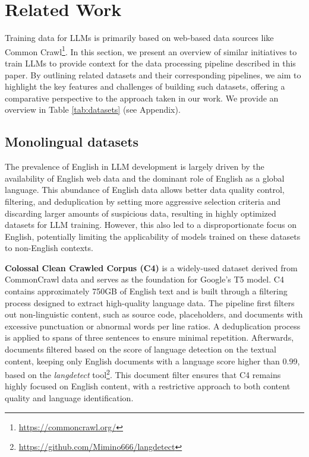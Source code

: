 \section{Related Work}
\label{sec:rel_work}
Training data for LLMs is primarily based on 
web-based data sources like Common Crawl\footnote{\url{https://commoncrawl.org/}}.  
In this section, we present an overview of similar initiatives 
to train LLMs to provide context for the data processing pipeline 
described in this paper. By outlining related datasets and their 
corresponding pipelines, we aim to highlight the key features 
and challenges of building such datasets, offering a comparative 
perspective to the approach taken in our 
work. We provide an overview in Table \ref{tab:datasets} (see Appendix).


\subsection{Monolingual datasets}
\label{sec:rel_work.mono}
The prevalence of English in LLM development is largely driven 
by the availability of English web data and the dominant role 
of English as a global language.
This abundance of English data allows better data quality control,
filtering, and deduplication by setting more aggressive selection criteria
and discarding larger amounts of suspicious data,
resulting in highly optimized datasets for LLM training.
However, this also led to a disproportionate focus on English, potentially limiting the applicability of models trained on these datasets to non-English contexts.

\textbf{Colossal Clean Crawled Corpus (C4)} \cite{raffel_shazeer_etal2020} 
is a widely-used dataset derived from CommonCrawl data and serves as the 
foundation for Google’s T5 model. C4 contains approximately 750GB of 
English text and is built through a filtering process designed to 
extract high-quality language data. The pipeline first filters out 
non-linguistic content, such as source code, placeholders, and documents 
with excessive punctuation or abnormal words per line ratios. A deduplication 
process is applied to spans of three sentences to ensure minimal repetition. 
Afterwards, documents filtered based on the score of language detection on
the textual content, keeping only English documents with a language score higher than 0.99, based
on the \textit{langdetect} tool\footnote{\url{https://github.com/Mimino666/langdetect}}. 
This document filter ensures that C4 remains highly focused on English content, with a 
restrictive approach to both content quality and language identification.


